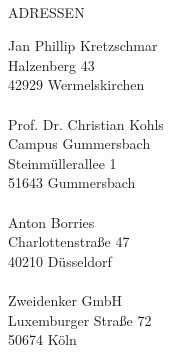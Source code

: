 	\begin{titlepage}
	~\\[7.5cm]
    {\large ADRESSEN}
	~\\[1.0cm]
	\begin{flushright}
    {\large Jan Phillip Kretzschmar}\\[0.1cm]
    {\large Halzenberg 43}\\[0.1cm]
    {\large 42929 Wermelskirchen}\\[0.1cm]
    ~\\[1.0cm]
    {\large Prof. Dr. Christian Kohls}\\[0.1cm]
    {\large Campus Gummersbach}\\[0.1cm]
    {\large Steinmüllerallee 1}\\[0.1cm]
    {\large 51643 Gummersbach}\\[0.1cm]
    ~\\[1.0cm]
    {\large Anton Borries}\\[0.1cm]
    {\large Charlottenstraße 47}\\[0.1cm]
    {\large 40210 Düsseldorf}\\[0.1cm]
    ~\\[1.0cm]
    {\large Zweidenker GmbH}\\[0.1cm]
    {\large Luxemburger Straße 72}\\[0.1cm]
    {\large 50674 Köln}\\[0.1cm]
	 \end{flushright}
    \end{titlepage}
    \pagebreak
    \section*{\contentsname}
    \startcontents
	 \pagebreak
	
    
    
    
    
    
    

    \lstlistoflistings
    \listoffigures
    \pagebreak
    
